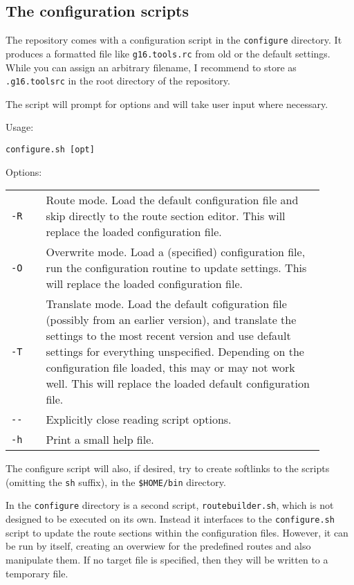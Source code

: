 \documentclass[   %
  final,          %
  a4paper         %
]{article}
\begin{document}
\subsection{The configuration scripts}

The repository comes with a configuration script in the \texttt{configure} directory.
It produces a formatted file like \lstinline`g16.tools.rc` from old or the default settings.
While you can assign an arbitrary filename, 
I recommend to store as \lstinline`.g16.toolsrc` in the root directory of the repository.

The script will prompt for options and will take user input where necessary.

Usage: 

\lstinline`configure.sh [opt]`

Options:

\begin{tabular}{p{0.1\linewidth}p{0.8\linewidth}}
  {\lstinline`-R`}       & Route mode. 
    Load the default configuration file and skip directly to the route section editor.
    This will replace the loaded configuration file.\\
  {\lstinline`-O`}       & Overwrite mode.
    Load a (specified) configuration file, run the configuration routine to update settings.
    This will replace the loaded configuration file.\\
  {\lstinline`-T`}       & Translate mode.
    Load the default cofiguration file (possibly from an earlier version), 
    and translate the settings to the most recent version and use default settings for everything unspecified.
    Depending on the configuration file loaded, this may or may not work well.
    This will replace the loaded default configuration file.\\
  {\lstinline`--`}       & Explicitly close reading script options. \\
  {\lstinline`-h`}       & Print a small help file. \\
\end{tabular}

The configure script will also, if desired, try to create softlinks to the scripts (omitting the \texttt{sh} suffix),
in the \texttt{\$HOME/bin} directory.

In the \texttt{configure} directory is a second script, \lstinline`routebuilder.sh`,
which is not designed to be executed on its own.
Instead it interfaces to the \lstinline`configure.sh` script to update the route sections within the configuration files.
However, it can be run by itself, creating an overwiew for the predefined routes and also manipulate them.
If no target file is specified, then they will be written to a temporary file.
\end{document}
